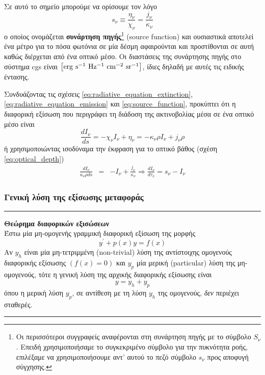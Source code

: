 Σε αυτό το σημείο μπορούμε να ορίσουμε τον λόγο 
\begin{equation}
    \label{eq:source_function}
    s_{\nu} \equiv \frac{\eta_{\nu}}{\chi_{\nu}} = \frac{j_{\nu}}{\kappa_{\nu}}
\end{equation}
ο οποίος ονομάζεται \textbf{συνάρτηση πηγής}\footnote{Οι περισσότεροι συγγραφείς αναφέρονται στη συνάρτηση πηγής με το σύμβολο $S_{\nu}$. Επειδή χρησιμοποιήσαμε το συγκεκριμένο σύμβολο για την πυκνότητα ροής, επιλέξαμε να χρησιμοποιήσουμε αντ' αυτού το πεζό σύμβολο $s_{\nu}$ προς αποφυγή σύγχησης.} (source function) και ουσιαστικά αποτελεί ένα μέτρο για το πόσα φωτόνια σε μία δέσμη αφαιρούνται και προστίθονται σε αυτή καθώς διέρχεται από ένα οπτικό μέσο. Οι διαστάσεις της συνάρτησης πηγής στο σύστημα cgs είναι $\rm \left[ erg \ s^{-1} \ Hz^{-1} \ cm^{-2} \ sr^{-1} \right]$, ίδιες δηλαδή με αυτές τις ειδικής έντασης.

Συνδυάζοντας τις σχέσεις \eqref{eq:radiative_equation_extinction}, \eqref{eq:radiative_equation_emission} και \eqref{eq:source_function}, προκύπτει ότι η διαφορική εξίσωση που περιγράφει τη διάδοση της ακτινοβολίας μέσα σε ένα οπτικό μέσο είναι
\begin{equation}
    \label{eq:radiative_transfer_equation}
    \frac{dI_{\nu}}{ds} = -\chi_{\nu} I_{\nu} + \eta_{\nu} =  - \kappa_{\nu} \rho I_{\nu} + j_{\nu} \rho
\end{equation}
ή χρησιμοποιώντας ισοδύναμα την έκφραση για το οπτικό βάθος (σχέση \eqref{eq:optical_depth})
\begin{eqnarray}
    \label{eq:radiative_transfer_equation_optical_depth_expressed}
    \frac{dI_{\nu}}{\kappa_{\nu} \rho ds} &=& - I_{\nu} + \frac{j_{\nu}}{\kappa_{\nu}} \Rightarrow  \boxed{\frac{dI_{\nu}}{d \tau_{\nu}} = s_{\nu} - I_{\nu}}
\end{eqnarray}



\subsubsection{Γενική λύση της εξίσωσης μεταφοράς}

{\color{red} \hrule} 
\textbf{Θεώρημα διαφορικών εξισώσεων}\\
Έστω μία μη-ομογενής γραμμική διαφορική εξίσωση της μορφής $$y^{\prime} + p(x) y = f(x)$$ 
Αν $y_h$ είναι μία μη-τετριμμένη (non-trivial) λύση της αντίστοιχης ομογενούς διαφορικής εξίσωσης $(f(x) = 0)$ και $y_p$ μία μερική (particular) λύση της μη-ομογενούς, τότε η γενική λύση της αρχικής διαφορικής εξίσωσης είναι $$y = y_h + y_p$$
όπου η μερική λύση $y_p$, σε αντίθεση με τη λύση $y_h$ της ομογενούς, \textit{δεν} περιέχει σταθερές.
{\color{red} \hrule} 

